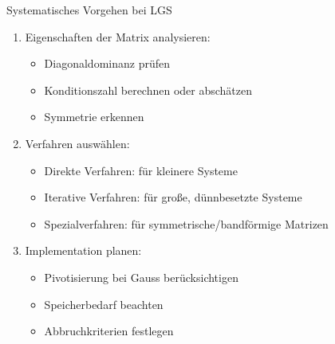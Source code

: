 \begin{KR}{Systematisches Vorgehen bei LGS}
\begin{enumerate}
    \item Eigenschaften der Matrix analysieren:
    \begin{itemize}
        \item Diagonaldominanz prüfen
        \item Konditionszahl berechnen oder abschätzen
        \item Symmetrie erkennen
    \end{itemize}
    
    \item Verfahren auswählen:
    \begin{itemize}
        \item Direkte Verfahren: für kleinere Systeme
        \item Iterative Verfahren: für große, dünnbesetzte Systeme
        \item Spezialverfahren: für symmetrische/bandförmige Matrizen
    \end{itemize}
    
    \item Implementation planen:
    \begin{itemize}
        \item Pivotisierung bei Gauss berücksichtigen
        \item Speicherbedarf beachten
        \item Abbruchkriterien festlegen
    \end{itemize}
\end{enumerate}
\end{KR}

